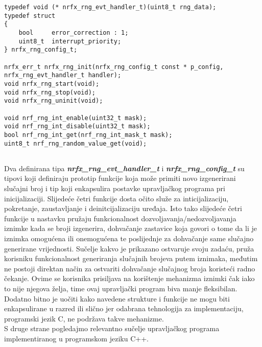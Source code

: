 \lstset{language=C, tabsize=2, frame=single, breaklines=true, showstringspaces=false}
\begin{lstlisting}
typedef void (* nrfx_rng_evt_handler_t)(uint8_t rng_data);
typedef struct
{
    bool     error_correction : 1;
    uint8_t  interrupt_priority;
} nrfx_rng_config_t;

nrfx_err_t nrfx_rng_init(nrfx_rng_config_t const * p_config, nrfx_rng_evt_handler_t handler);
void nrfx_rng_start(void);
void nrfx_rng_stop(void);
void nrfx_rng_uninit(void);

void nrf_rng_int_enable(uint32_t mask);
void nrf_rng_int_disable(uint32_t mask);
bool nrf_rng_int_get(nrf_rng_int_mask_t mask);
uint8_t nrf_rng_random_value_get(void);
          
\end{lstlisting}
Dva definirana tipa \textbf{\textit{nrfx\_rng\_evt\_handler\_t}} i \textbf{\textit{nrfx\_rng\_config\_t}} su tipovi koji definiraju prototip funkcije koja može primiti novo izgenerirani slučajni broj i tip koji enkapsulira postavke upravljačkog programa pri inicijalizaciji. Slijedeće četri funkcije dosta očito služe za inticijalizaciju, pokretanje, zaustavljanje i deinitcijalizaciju uređaja. Isto tako slijedeće četri funkcije u nastavku pružaju funkcionalnost dozvoljavanja/nedozvoljavanja iznimke kada se broji izgenerira, dohvačanje zastavice koja govori o tome da li je iznimka omogućena ili onemogućena te poslijednje za dohvačanje same slučajno generirane vrijednosti. Sučelje kakvo je prikazano ostvaruje svoju zadaću, pruža korisniku funkcionalnost generiranja slučajnih brojeva putem iznimaka, međutim ne postoji direktan način za ostvariti dohvačanje slučajnog broja koristeći radno čekanje. Ovime se korisnika prisiljava na korištenje mehanizma iznimki čak iako to nije njegova želja, time ovaj upravljački program biva manje fleksibilan. Dodatno bitno je uočiti kako navedene strukture i funkcije ne mogu biti enkapsulirane u razred ili slično jer odabrana tehnologija za implementaciju, programski jezik C, ne podržava takve mehanizme. \\
S druge strane pogledajmo relevantno sučelje upravljačkog programa implementiranog u programskom jeziku C++.
\lstset{language=C++, tabsize=2, frame=single, breaklines=true, showstringspaces=false}
